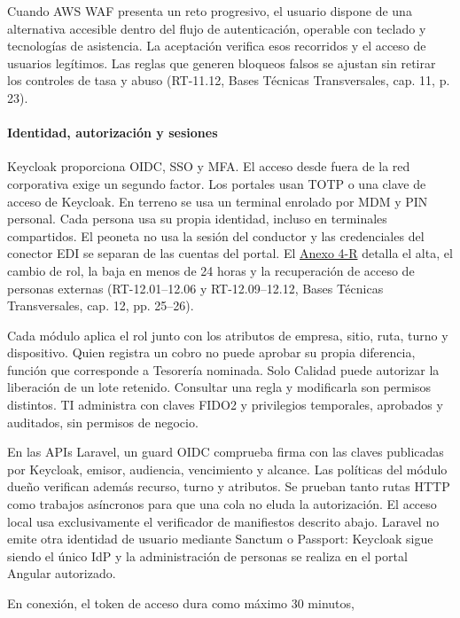 Cuando AWS WAF presenta un reto progresivo, el usuario dispone de una alternativa accesible dentro del flujo de autenticación, operable con teclado y tecnologías de asistencia. La aceptación verifica esos recorridos y el acceso de usuarios legítimos. Las reglas que generen bloqueos falsos se ajustan sin retirar los controles de tasa y abuso (RT-11.12, Bases Técnicas Transversales, cap. 11, p. 23).

\paragraph{Identidad, autorización y sesiones}
Keycloak proporciona OIDC, SSO y MFA. El acceso desde fuera de la red corporativa exige un segundo factor. Los portales usan TOTP o una clave de acceso de Keycloak. En terreno se usa un terminal enrolado por MDM y PIN personal. Cada persona usa su propia identidad, incluso en terminales compartidos. El peoneta no usa la sesión del conductor y las credenciales del conector EDI se separan de las cuentas del portal. El \href{LAFROX-Subdocumento4-Anexos.pdf#anxR:ciclo-identidad}{Anexo 4-R} detalla el alta, el cambio de rol, la baja en menos de 24 horas y la recuperación de acceso de personas externas (RT-12.01--12.06 y RT-12.09--12.12, Bases Técnicas Transversales, cap. 12, pp. 25--26).

Cada módulo aplica el rol junto con los atributos de empresa, sitio, ruta, turno y dispositivo. Quien registra un cobro no puede aprobar su propia diferencia, función que corresponde a Tesorería nominada. Solo Calidad puede autorizar la liberación de un lote retenido. Consultar una regla y modificarla son permisos distintos. TI administra con claves FIDO2 y privilegios temporales, aprobados y auditados, sin permisos de negocio.

En las APIs Laravel, un guard OIDC comprueba firma con las claves publicadas por Keycloak, emisor, audiencia, vencimiento y alcance. Las políticas del módulo dueño verifican además recurso, turno y atributos. Se prueban tanto rutas HTTP como trabajos asíncronos para que una cola no eluda la autorización. El acceso local usa exclusivamente el verificador de manifiestos descrito abajo. Laravel no emite otra identidad de usuario mediante Sanctum o Passport: Keycloak sigue siendo el único IdP y la administración de personas se realiza en el portal Angular autorizado.

En conexión, el token de acceso dura como máximo 30 minutos,


